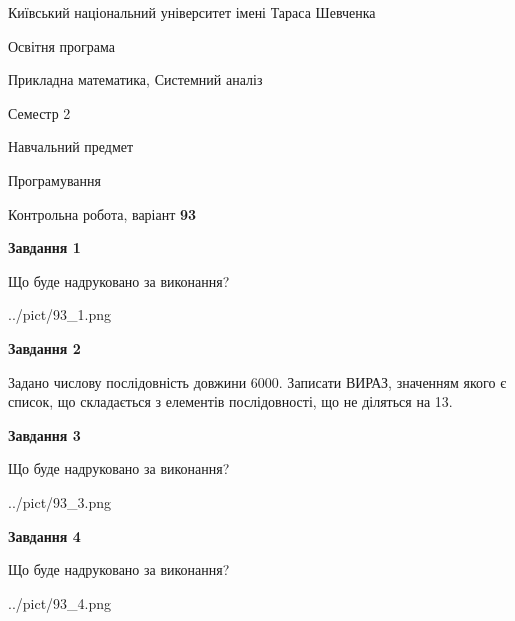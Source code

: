 \documentclass[12pt, ukrainian]{article}
\begin{document}
{{\begin {small}\par
{ \center  Київський національний університет імені Тараса Шевченка \par}
{\parbox {5 cm}{Освітня програма \hfill}{\parbox {8 cm}{Прикладна математика, Системний аналіз \hfill}}\parbox {5 cm}{\hfill Семестр 2}}\par
{\parbox {5 cm} {Навчальний предмет \hfill}\parbox {7 cm}{Програмування \hfill}\parbox {6cm}{\hfill}\par}\vspace{-7pt} \end{small}}{\center Контрольна робота, варіант  \No \textbf
{ 93 }\par}}
{
\begin {large}
{\begin {center}\textbf{Завдання 1}\end {center}}\par
Що буде надруковано за виконання?\par\par
\begin{center}
	{../pict/93_1.png}
\end{center}
\newpage

{\begin {center}\textbf{Завдання 2}\end {center}}\par

 Задано числову послідовність  довжини 6000. Записати ВИРАЗ, значенням якого є список, що складається з елементів послідовності, що не діляться на 13.\par
\newpage

{\begin {center}\textbf{Завдання 3}\end {center}}\par
Що буде надруковано за виконання?\par
\begin{center}
	{../pict/93_3.png}
\end{center}
\newpage

{\begin {center}\textbf{Завдання 4}\end {center}}\par
Що буде надруковано за виконання?\par
\begin{center}
	{../pict/93_4.png}
\end{center}
\newpage


\end{large}}
\end{document}
